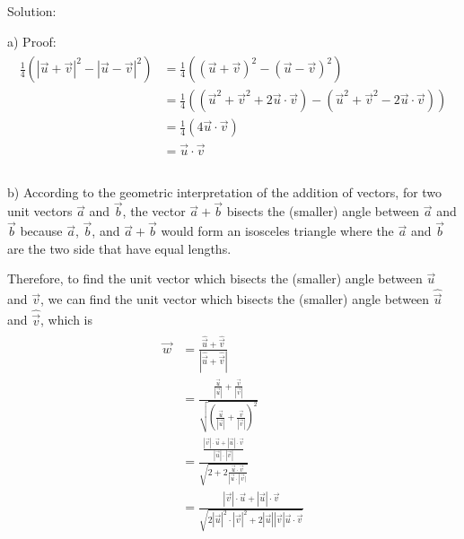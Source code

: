 \documentclass{article}
\begin{document}
Solution:

a) Proof:
\begin{gather*}
  \begin{split}
    \frac{1}{4}(|\vec{u} + \vec{v}|^{2} - |\vec{u} - \vec{v}|^{2}) &= \frac{1}{4}((\vec{u} + \vec{v})^2 - (\vec{u} - \vec{v})^2) \\
                                                                   &= \frac{1}{4}((\vec{u}^2 + \vec{v}^2 + 2\vec{u} \cdot \vec{v}) - (\vec{u}^2 + \vec{v}^2 - 2\vec{u} \cdot \vec{v})) \\
                                                                   &= \frac{1}{4}(4\vec{u} \cdot \vec{v}) \\
                                                                   &= \vec{u} \cdot \vec{v} \\
  \end{split} \\
\end{gather*}

b) According to the geometric interpretation of the addition of vectors, for two 
unit vectors $\vec{a}$ and $\vec{b}$, the vector $\vec{a} + \vec{b}$ bisects the 
(smaller) angle between $\vec{a}$ and $\vec{b}$ because $\vec{a}$, $\vec{b}$, 
and $\vec{a} + \vec{b}$ would form an isosceles triangle where the $\vec{a}$ and 
$\vec{b}$ are the two side that have equal lengths.

Therefore, to find the unit vector which bisects the (smaller) angle between 
$\vec{u}$ and $\vec{v}$, we can find the unit vector which bisects the (smaller) 
angle between $\hat{\vec{u}}$ and $\hat{\vec{v}}$, which is
\begin{gather*}
  \begin{split}
    \vec{w} &= \frac{\hat{\vec{u}} + \hat{\vec{v}}}{|\hat{\vec{u}} + \hat{\vec{v}}|} \\
            &= \frac{\frac{\vec{u}}{|\vec{u}|} + \frac{\vec{v}}{|\vec{v}|}}{\sqrt{(\frac{\vec{u}}{|\vec{u}|} + \frac{\vec{v}}{|\vec{v}|})^2}} \\
            &= \frac{\frac{|\vec{v}| \cdot \vec{u} + |\vec{u}| \cdot \vec{v}}{|\vec{u}| \cdot |\vec{v}|}}{\sqrt{2 + 2\frac{\vec{u} \cdot \vec{v}}{|\vec{u} \cdot |\vec{v}|}}} \\
            &= \frac{|\vec{v}| \cdot \vec{u} + |\vec{u}| \cdot \vec{v}}{\sqrt{2|\vec{u}|^2 \cdot |\vec{v}|^2 + 2|\vec{u}||\vec{v}|\vec{u} \cdot \vec{v}}}
  \end{split} \\
\end{gather*}
\end{document}
